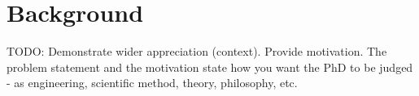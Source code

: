 \chapter{Background}

TODO: Demonstrate wider appreciation (context). Provide motivation. The problem statement and the motivation state how you want the PhD to be judged - as engineering, scientific method, theory, philosophy, etc.